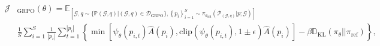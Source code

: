\begin{equation} \label{eq:grpo_detailed}
\begin{split}
    \mathcal{J}&_{\textrm{GRPO}}(\theta) = {\mathbb{E}_{[\mathcal{G},q \sim {\{\mathbb{P}(\mathcal{G},q) |(\mathcal{G},q) \in \mathcal{D}_\textrm{GRPO}\}},\left \{ p_i \right  \} _{i = 1}^{S} \sim \pi_{\theta_{\textrm{old}}}(\mathcal{P}_{(\mathcal{G}, q)}|p;\mathcal{G} )]}}  \\
 &\frac{1}{S}\sum_{i=1}^{S}  \frac{1}{|p_i|} \sum_{t = 1}^{|p_i|}\left \{  \min \left[ \psi _{\theta }(p_{i,t})\hat{A}(p_i), \text{clip} \left(  \psi _{\theta }(p_{i,t}), 1 \pm \epsilon\right) \hat{A}(p_i)  \right] - \beta \mathbb{D}_{\text{KL}}(\pi_{\theta} || \pi_{\text{ref}})\right \},
\end{split}
\end{equation}
